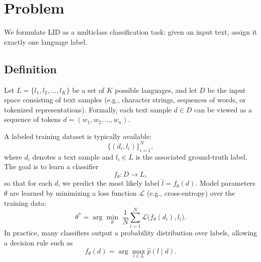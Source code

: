 \section{Problem}\label{sec:problem}

We formulate LID as a multiclass classification task: given an input text, assign it exactly one language label.

\subsection{Definition}\label{subsec:definition}
Let $L = \{l_1, l_2, \dots, l_K\}$ be a set of $K$ possible languages, and let $D$ be the input space consisting of text samples (e.g., character strings, sequences of words, or tokenized representations). Formally, each text sample $d \in D$ can be viewed as a sequence of tokens $d = (w_1, w_2, \dots, w_n)$. 

A labeled training dataset is typically available:
\[
    \{(d_i, l_i)\}_{i=1}^N,
\]
where $d_i$ denotes a text sample and $l_i \in L$ is the associated ground-truth label. The goal is to learn a classifier
\[
    f_\theta: D \to L,
\]
so that for each $d$, we predict the most likely label $\hat{l} = f_\theta(d)$. Model parameters $\theta$ are learned by minimizing a loss function $\mathcal{L}$ (e.g., cross-entropy) over the training data:
\[
    \theta^* = \arg\min_\theta \; \frac{1}{N} \sum_{i=1}^N \mathcal{L}\bigl(f_\theta(d_i), l_i\bigr).
\]
In practice, many classifiers output a probability distribution over labels, allowing a decision rule such as
\[
    f_\theta(d) = \arg\max_{l \in L} \hat{p}(l \mid d).
\]

